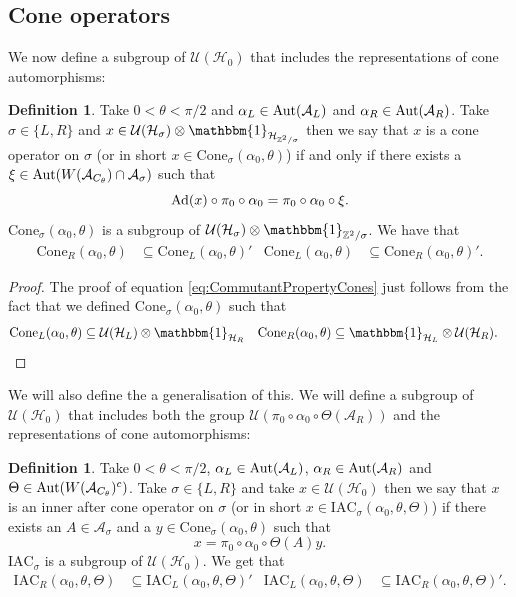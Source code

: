 \documentclass[12pt,a4paper,twoside]{article}
\let\originalleft\left
\let\originalright\right
\renewcommand{\left}{\mathopen{}\mathclose\bgroup\originalleft}
\renewcommand{\right}{\aftergroup\egroup\originalright}
\newcommand{\UU}{\mathcal U}
\newcommand{\HH}{\mathcal H}
\newcommand{\ZZ}{\mathbb Z}
\renewcommand{\AA}{\mathcal A}
\newcommand{\id}{\mathbbm{1}}
\newcommand{\Ad}[1]{\textrm{Ad}\left(#1\right)}
\newcommand{\Aut}[1]{\textrm{Aut}\left(#1\right)}
\theoremstyle{definition}
\newtheorem{definition}[theorem]{Definition}
\numberwithin{equation}{section}
\begin{document}
\subsection{Cone operators}
 We now define a subgroup of $\UU(\HH_0)$ that includes the representations of cone automorphisms:
\begin{definition}\label{def:ConeOperators}
	Take $0<\theta<\pi/2$ and $\alpha_L\in\Aut{\AA_{L}}$ and $\alpha_R\in\Aut{\AA_{R}}$. Take $\sigma\in\{L,R\}$ and $x\in\UU(\HH_{\sigma})\otimes\id_{\HH_{\ZZ^2/\sigma}}$ then we say that $x$ is a cone operator on $\sigma$ (or in short $x\in\textrm{Cone}_{\sigma}(\alpha_0,\theta)$) if and only if there exists a $\xi\in\Aut{W(\AA_{C_\theta})\cap\AA_\sigma}$ such that
	\begin{equation}
		\Ad{x}\circ\pi_0\circ\alpha_0=\pi_0\circ\alpha_0\circ\xi.
	\end{equation}
	$\textrm{Cone}_\sigma(\alpha_0,\theta)$ is a subgroup of $\UU(\HH_\sigma)\otimes\id_{\ZZ^2/\sigma}$. We have that
	\begin{align}\label{eq:CommutantPropertyCones}
		\textrm{Cone}_R(\alpha_0,\theta)&\subseteq\textrm{Cone}_L(\alpha_0,\theta)'&\textrm{Cone}_L(\alpha_0,\theta)&\subseteq\textrm{Cone}_R(\alpha_0,\theta)'.
	\end{align}
\end{definition}
\begin{proof}
	The proof of equation \eqref{eq:CommutantPropertyCones} just follows from the fact that we defined $\textrm{Cone}_\sigma(\alpha_0,\theta)$ such that
	\begin{align}
		\textrm{Cone}_L(\alpha_0,\theta)&\subseteq \UU(\HH_L)\otimes\id_{\HH_R}&\textrm{Cone}_R(\alpha_0,\theta)&\subseteq \id_{\HH_L} \otimes \UU(\HH_R).
	\end{align}
\end{proof}
We will also define the a generalisation of this. We will define a subgroup of $\UU(\HH_0)$ that includes both the group $\UU(\pi_0\circ\alpha_0\circ\Theta(\AA_R))$ and the representations of cone automorphisms:
\begin{definition}
	Take $0<\theta<\pi/2$, $\alpha_L\in\Aut{\AA_{L}}$, $\alpha_R\in\Aut{\AA_{R}}$ and $\Theta\in\Aut{W(\AA_{C_\theta})^c}$. Take $\sigma\in\{L,R\}$ and take $x\in\UU(\HH_0)$ then we say that $x$ is an inner after cone operator on $\sigma$ (or in short $x\in \textrm{IAC}_\sigma(\alpha_0,\theta,\Theta)$) if there exists an $A\in\AA_\sigma$ and a $y\in\textrm{Cone}_\sigma(\alpha_0,\theta)$ such that
	\begin{equation}
		x=\pi_0\circ\alpha_0\circ\Theta(A)y.
	\end{equation}
	$\textrm{IAC}_\sigma$ is a subgroup of $\UU(\HH_0)$. We get that
	\begin{align}\label{eq:CommutantProperty}
		\textrm{IAC}_R(\alpha_0,\theta,\Theta)&\subseteq\textrm{IAC}_L(\alpha_0,\theta,\Theta)'&\textrm{IAC}_L(\alpha_0,\theta,\Theta)&\subseteq\textrm{IAC}_R(\alpha_0,\theta,\Theta)'.
	\end{align}
\end{definition}
\end{document}
